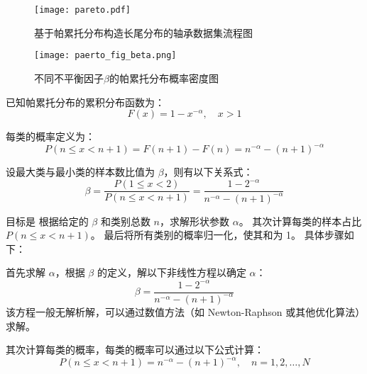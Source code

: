 \documentclass[master]{thesis-uestc}
\begin{document}
\begin{enumerate}[label={(\arabic*)}]
    \begin{figure}[h]
        \centering
        \texttt{[image: pareto.pdf]}
        \caption{基于帕累托分布构造长尾分布的轴承数据集流程图}
        \label{pareto}
    \end{figure}

    \begin{figure}[h]
        \centering
        \texttt{[image: paerto\_fig\_beta.png]}
        \caption{不同不平衡因子$\beta$的帕累托分布概率密度图}
        \label{paerto_fig_beta}
    \end{figure}

    已知帕累托分布的累积分布函数为：
    \begin{equation}
    F(x) = 1 - x^{-\alpha}, \quad x > 1
    \end{equation}

    每类的概率定义为：
    \begin{equation}
    P(n \leq x < n+1) = F(n+1) - F(n) = n^{-\alpha} - (n+1)^{-\alpha}
    \end{equation}

    设最大类与最小类的样本数比值为 $\beta$，则有以下关系式：
    \begin{equation}
    \beta = \frac{P(1 \leq x < 2)}{P(n \leq x < n+1)} = \frac{1 - 2^{-\alpha}}{n^{-\alpha} - (n+1)^{-\alpha}}
    \end{equation}

    目标是
        根据给定的 $\beta$ 和类别总数 $n$，求解形状参数 $\alpha$。
        其次计算每类的样本占比 $P(n \leq x < n+1)$。
        最后将所有类别的概率归一化，使其和为 1。
    具体步骤如下：
        
    首先求解 $\alpha$，根据 $\beta$ 的定义，解以下非线性方程以确定 $\alpha$：
    \begin{equation}
    \beta = \frac{1 - 2^{-\alpha}}{n^{-\alpha} - (n+1)^{-\alpha}}
    \end{equation}
    该方程一般无解析解，可以通过数值方法（如 Newton-Raphson 或其他优化算法）求解。

    其次计算每类的概率，每类的概率可以通过以下公式计算：
    \begin{equation}
    P(n \leq x < n+1) = n^{-\alpha} - (n+1)^{-\alpha}, \quad n = 1, 2, \dots, N
    \end{equation}


\end{enumerate}
\end{document}
